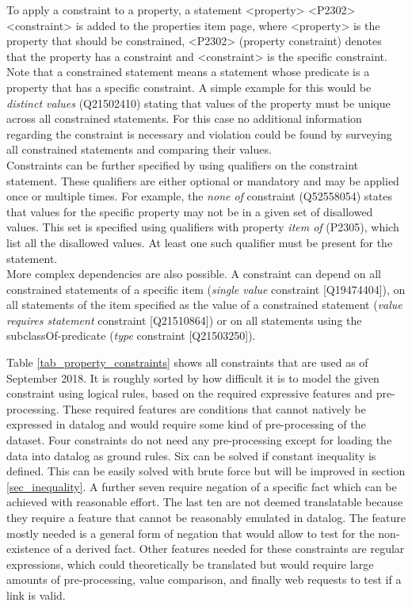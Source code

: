 \documentclass[hyperref,bachelorofscience,fleqn]{cgvpub}
\begin{document}
To apply a constraint to a property, a statement <property> <P2302> <constraint> is added to the properties item page, where <property> is the property that should be constrained, <P2302> (property constraint) denotes that the property has a constraint and <constraint> is the specific constraint. Note that a constrained statement means a statement whose predicate is a property that has a specific constraint. A simple example for this would be \emph{distinct values} (Q21502410) stating that values of the property must be unique across all constrained statements. For this case no additional information regarding the constraint is necessary and violation could be found by surveying all constrained statements and comparing their values.\\
Constraints can be further specified by using qualifiers on the constraint statement. These qualifiers are either optional or mandatory and may be applied once or multiple times. For example, the \emph{none of} constraint (Q52558054) states that values for the specific property may not be in a given set of disallowed values. This set is specified using qualifiers with property \emph{item of} (P2305), which list all the disallowed values. At least one such qualifier must be present for the statement.\\
More complex dependencies are also possible. A constraint can depend on all constrained statements of a specific item (\emph{single value} constraint [Q19474404]), on all statements of the item specified as the value of a constrained statement (\emph{value requires statement} constraint [Q21510864]) or on all statements using the subclassOf-predicate (\emph{type} constraint [Q21503250]).

Table \ref{tab_property_constraints} shows all constraints that are used as of September 2018. It is roughly sorted by how difficult it is to model the given constraint using logical rules, based on the required expressive features and pre-processing. These required features are conditions that cannot natively be expressed in datalog and would require some kind of pre-processing of the dataset. Four constraints do not need any pre-processing except for loading the data into datalog as ground rules. Six can be solved if constant inequality is defined. This can be easily solved with brute force but will be improved in section \ref{sec_inequality}. A further seven require negation of a specific fact which can be achieved with reasonable effort. The last ten are not deemed translatable because they require a feature that cannot be reasonably emulated in datalog. The feature mostly needed is a general form of negation that would allow to test for the non-existence of a derived fact. Other features needed for these constraints are regular expressions, which could theoretically be translated but would require large amounts of pre-processing, value comparison, and finally web requests to test if a link is valid.
\end{document}
